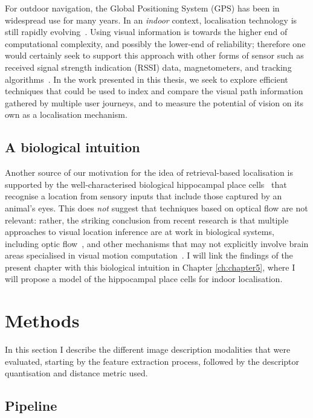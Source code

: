 For outdoor navigation, the Global Positioning System (GPS) has been in widespread use for many years.  In an \textit{indoor} context, localisation technology is still rapidly evolving~\cite{Shen,Wang2012,Quigley2010}.  Using visual information is towards the higher end of computational complexity, and possibly the lower-end of reliability; therefore one would certainly seek to support this approach with other forms of sensor such as received signal strength indication (RSSI) data, magnetometers, and tracking algorithms~\cite{Schroth2011,Schroth2012,Quigley2010}.  In the work presented in this thesis, we seek to explore efficient techniques that could be used to index and compare the visual path information gathered by multiple user journeys, and to measure the potential of vision on its own as a localisation mechanism. 
%
\subsection{A biological intuition}

Another source of our motivation for the idea of retrieval-based localisation is supported by the well-characterised biological hippocampal place cells~\cite{burgess2002human} that recognise a location from sensory inputs that include those captured by an animal's eyes. This does  \textit{not} suggest that techniques based on optical flow are not relevant: rather, the striking conclusion from recent research is that multiple approaches to visual location inference are at work in biological systems, including optic flow~\cite{Layton2014}, and other mechanisms that may not explicitly involve brain areas specialised in visual motion computation~\cite{hartley2014space}. I will link the findings of the present chapter with this biological intuition in Chapter \ref{ch:chapter5}, where I will propose a model of the hippocampal place cells for indoor localisation.


\section{Methods}
\label{sec:methods}

In this section I describe the different image description modalities that were evaluated, starting by the feature extraction process, followed by the descriptor quantisation and distance metric used.

\subsection{Pipeline}

